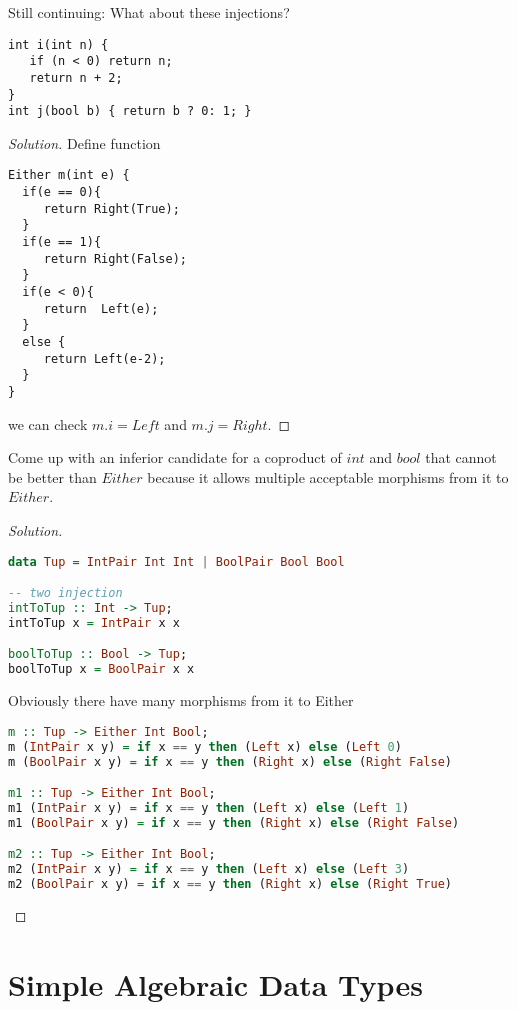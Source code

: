 \documentclass[7x10,thmnumcontwithchapter,WebLink,AddlevelTwoTOC,NumRef,BookEndNote,printer]{pupbook}
\begin{document}
\begin{exercise}
Still continuing: What about these injections?
\begin{lstlisting}
int i(int n) {
   if (n < 0) return n;
   return n + 2;
}
int j(bool b) { return b ? 0: 1; }
\end{lstlisting}
\end{exercise}


\begin{proof}[Solution]	
Define function
\begin{lstlisting}
Either m(int e) {
  if(e == 0){
     return Right(True);
  }
  if(e == 1){
     return Right(False);
  }
  if(e < 0){
     return  Left(e);
  }
  else {
     return Left(e-2);
  }
}
\end{lstlisting}
we can check $m . i = Left$ and $m . j = Right$.
\end{proof}


\begin{exercise}
Come up with an inferior candidate for a coproduct of $int$ and $bool$ that cannot be better than $Either$ because it allows multiple acceptable morphisms from it to $Either$.
\end{exercise}

\begin{proof}[Solution]
~\\
\begin{lstlisting}[language=Haskell]
data Tup = IntPair Int Int | BoolPair Bool Bool 

-- two injection
intToTup :: Int -> Tup;
intToTup x = IntPair x x

boolToTup :: Bool -> Tup;
boolToTup x = BoolPair x x 
\end{lstlisting}
Obviously there have many morphisms from it to Either 
\begin{lstlisting}[language=Haskell]
m :: Tup -> Either Int Bool;
m (IntPair x y) = if x == y then (Left x) else (Left 0) 
m (BoolPair x y) = if x == y then (Right x) else (Right False) 

m1 :: Tup -> Either Int Bool;
m1 (IntPair x y) = if x == y then (Left x) else (Left 1) 
m1 (BoolPair x y) = if x == y then (Right x) else (Right False)

m2 :: Tup -> Either Int Bool;
m2 (IntPair x y) = if x == y then (Left x) else (Left 3) 
m2 (BoolPair x y) = if x == y then (Right x) else (Right True)  
\end{lstlisting}
\end{proof}


\chapter[Simple Algebraic Data Types]{Simple Algebraic Data Types\thefootnote}
\end{document}
